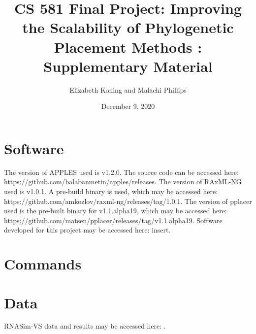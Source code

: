 \documentclass[10pt]{article}
\title{CS 581 Final Project: Improving the Scalability of Phylogenetic Placement Methods : Supplementary Material}
\author{Elizabeth Koning and Malachi Phillips}
\date{December 9, 2020}
\begin{document}
\maketitle

\section{Software}
The version of APPLES used is v1.2.0. The source code can be accessed here:\newline
https://github.com/balabanmetin/apples/releases.\newline
The version of RAxML-NG used is v1.0.1. A pre-build binary is used, which may be accessed here:\newline
https://github.com/amkozlov/raxml-ng/releases/tag/1.0.1.\newline
The version of pplacer used is the pre-built binary for v1.1.alpha19, which may be accessed here:\newline
https://github.com/matsen/pplacer/releases/tag/v1.1.alpha19.
Software developed for this project may be accessed here: insert.

\section{Commands}
\section{Data}

RNASim-VS data and results may be accessed here: .
\end{document}
